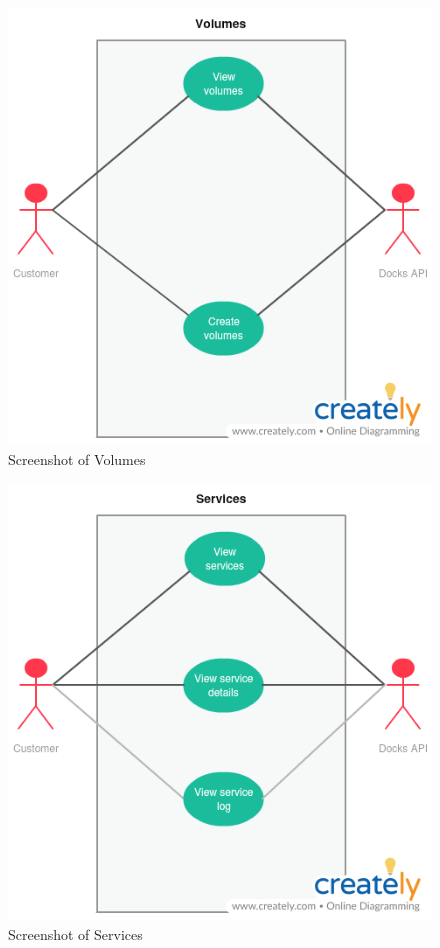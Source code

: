 \documentclass[]{article}
\begin{document}
\begin{figure}[H]
	\centering
	\includegraphics[scale=0.5]{uml/volumes.png}
	\caption{Screenshot of Volumes}
\end{figure}

\begin{figure}[H]
	\centering
	\includegraphics[scale=0.5]{uml/services.png}
	\caption{Screenshot of Services}
\end{figure}
\end{document}
